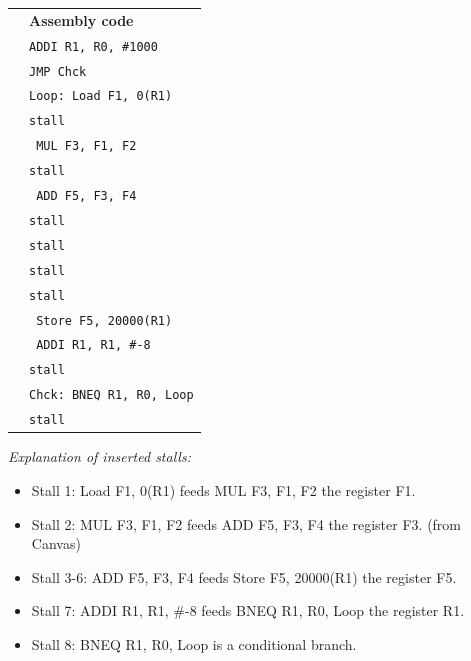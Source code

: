 \documentclass[a4paper, 11pt]{exam}
\begin{document}
\begin{enumerate}
\begin{enumerate}
	\hfill
 
\begin{tabular}{ll}
	& \textbf{Assembly code }\\
	&\hspace{40pt}\texttt{ADDI R1, R0, \#1000} \\
	&\hspace{40pt}\texttt{JMP Chck}\\
	&\texttt{Loop: Load F1, 0(R1)} \\
	&\hspace{40pt}\texttt{stall}\\
    &\hspace{35pt}\texttt{ MUL F3, F1, F2}\\
    &\hspace{40pt}\texttt{stall}\\
	&\hspace{35pt}\texttt{ ADD F5, F3, F4}\\
	&\hspace{40pt}\texttt{stall}\\
	&\hspace{40pt}\texttt{stall}\\
	&\hspace{40pt}\texttt{stall}\\
	&\hspace{40pt}\texttt{stall}\\
	&\hspace{35pt}\texttt{ Store F5, 20000(R1)}\\
	&\hspace{35pt}\texttt{ ADDI R1, R1, \#-8}\\
	&\hspace{40pt}\texttt{stall}\\
	&\texttt{Chck: BNEQ R1, R0, Loop}\\
	&\hspace{40pt}\texttt{stall}\\
\end{tabular}

\hfill

\textit{Explanation of inserted stalls:}
\begin{itemize}
	\item Stall 1: Load F1, 0(R1) feeds MUL F3, F1, F2 the register F1.
	\item Stall 2: MUL F3, F1, F2 feeds ADD F5, F3, F4 the register F3. (from Canvas)
	\item Stall 3-6: ADD F5, F3, F4 feeds Store F5, 20000(R1) the register F5.
	\item Stall 7: ADDI R1, R1, \#-8 feeds BNEQ R1, R0, Loop the register R1.
	\item Stall 8: BNEQ R1, R0, Loop is a conditional branch.
\end{itemize}


\end{enumerate}
\end{enumerate}
\end{document}
